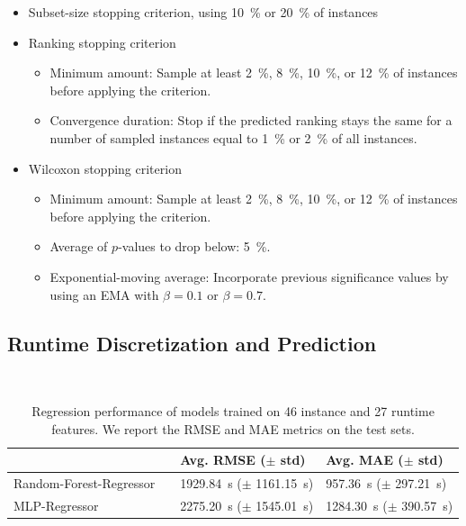 \documentclass[runningheads]{llncs}
\begin{document}
\begin{itemize}
  \item Subset-size stopping criterion, using \SI{10}{\%} or \SI{20}{\%} of instances
  \item Ranking stopping criterion
  \begin{itemize}
    \item Minimum amount: Sample at least \SI{2}{\%}, \SI{8}{\%}, \SI{10}{\%}, or \SI{12}{\%} of instances before applying the criterion.
    \item Convergence duration: Stop if the predicted ranking stays the same for a number of sampled instances equal to \SI{1}{\%} or \SI{2}{\%} of all instances.
  \end{itemize}

  \item Wilcoxon stopping criterion
  \begin{itemize}
    \item Minimum amount: Sample at least \SI{2}{\%}, \SI{8}{\%}, \SI{10}{\%}, or \SI{12}{\%} of instances before applying the criterion.
    \item Average of $p$-values to drop below: \SI{5}{\%}.
    \item Exponential-moving average: Incorporate previous significance values by using an EMA with $\beta = 0.1$ or $\beta = 0.7$.
  \end{itemize}
\end{itemize}

\subsection{Runtime Discretization and Prediction}

\begin{table}[htbp]
  \centering
  \caption{Regression performance of models trained on 46 instance and 27 runtime features. We report the RMSE and MAE metrics on the test sets.}
  ~\\[1em]
  \begin{tabular}{
    >{\raggedleft\arraybackslash}m{}
    >{\centering\arraybackslash}m{}
    >{\centering\arraybackslash}m{}
    >{\centering\arraybackslash}m{}
  }
    \toprule
    {Regression Models} & & {Avg. RMSE ($\pm$ std)} & {Avg. MAE ($\pm$ std)} \\
    \midrule
    Random-Forest-Regressor & & \SI{1929.84}{s} ($\pm$ \SI{1161.15}{s}) & \phantom{0}\SI{957.36}{s} ($\pm$ \SI{297.21}{s}) \\[0.4ex]
    MLP-Regressor           & & \SI{2275.20}{s} ($\pm$ \SI{1545.01}{s}) & \SI{1284.30}{s} ($\pm$ \SI{390.57}{s}) \\
    \bottomrule
  \end{tabular}
\end{table}
\end{document}
